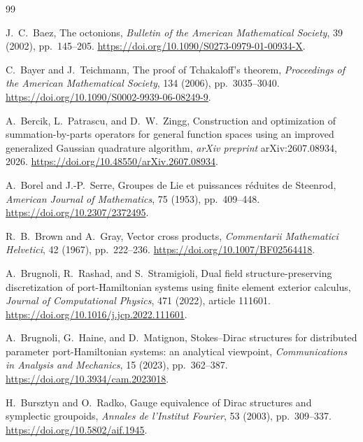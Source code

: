\documentclass[11pt,a4paper]{article}
\theoremstyle{definition}
\theoremstyle{remark}
\begin{document}
\begin{thebibliography}{99}
\footnotesize

J.~C.~Baez,
\newblock The octonions,
\newblock \emph{Bulletin of the American Mathematical Society}, 39 (2002), pp.~145--205.
\newblock \url{https://doi.org/10.1090/S0273-0979-01-00934-X}.

C.~Bayer and J.~Teichmann,
\newblock The proof of Tchakaloff's theorem,
\newblock \emph{Proceedings of the American Mathematical Society}, 134 (2006),
pp.~3035--3040.
\newblock \url{https://doi.org/10.1090/S0002-9939-06-08249-9}.

A.~Bercik, L.~Patrascu, and D.~W.~Zingg,
\newblock Construction and optimization of summation-by-parts operators for general function spaces using an improved generalized Gaussian quadrature algorithm,
\newblock \emph{arXiv preprint} arXiv:2607.08934, 2026.
\newblock \url{https://doi.org/10.48550/arXiv.2607.08934}.

A.~Borel and J.-P.~Serre,
\newblock Groupes de Lie et puissances r\'eduites de Steenrod,
\newblock \emph{American Journal of Mathematics}, 75 (1953), pp.~409--448.
\newblock \url{https://doi.org/10.2307/2372495}.

R.~B.~Brown and A.~Gray,
\newblock Vector cross products,
\newblock \emph{Commentarii Mathematici Helvetici}, 42 (1967), pp.~222--236.
\newblock \url{https://doi.org/10.1007/BF02564418}.

A.~Brugnoli, R.~Rashad, and S.~Stramigioli,
\newblock Dual field structure-preserving discretization of port-Hamiltonian systems using
finite element exterior calculus,
\newblock \emph{Journal of Computational Physics}, 471 (2022), article 111601.
\newblock \url{https://doi.org/10.1016/j.jcp.2022.111601}.

A.~Brugnoli, G.~Haine, and D.~Matignon,
\newblock Stokes--Dirac structures for distributed parameter port-Hamiltonian systems:
an analytical viewpoint,
\newblock \emph{Communications in Analysis and Mechanics}, 15 (2023), pp.~362--387.
\newblock \url{https://doi.org/10.3934/cam.2023018}.

H.~Bursztyn and O.~Radko,
\newblock Gauge equivalence of Dirac structures and symplectic groupoids,
\newblock \emph{Annales de l'Institut Fourier}, 53 (2003), pp.~309--337.
\newblock \url{https://doi.org/10.5802/aif.1945}.


\end{thebibliography}
\end{document}
